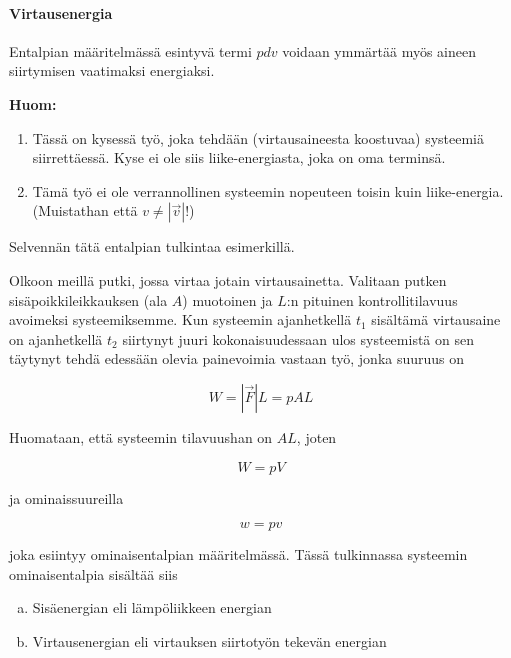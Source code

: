 \documentclass[12pt,a4paper,finnish]{book}
\begin{document}
\paragraph{Virtausenergia}

Entalpian määritelmässä esintyvä termi $pdv$ voidaan ymmärtää myös aineen siirtymisen vaatimaksi energiaksi. 

\textbf{Huom:}

\begin{enumerate}
 \item Tässä on kysessä työ, joka tehdään (virtausaineesta koostuvaa) systeemiä siirrettäessä. Kyse ei ole siis liike-energiasta, 
  joka on oma terminsä.
 \item Tämä työ ei ole verrannollinen systeemin nopeuteen toisin kuin liike-energia. (Muistathan että $v \neq \left|\vec{v}\right|$!)
\end{enumerate}

Selvennän tätä entalpian tulkintaa esimerkillä.

Olkoon meillä putki, jossa virtaa jotain virtausainetta. Valitaan putken sisäpoikkileikkauksen (ala $A$) muotoinen ja $L$:n 
pituinen kontrollitilavuus avoimeksi systeemiksemme. Kun systeemin ajanhetkellä $t_1$ sisältämä virtausaine on 
ajanhetkellä $t_2$ siirtynyt juuri kokonaisuudessaan ulos systeemistä on sen täytynyt tehdä edessään olevia 
painevoimia vastaan työ, jonka suuruus on

\begin{equation}
 W = |\vec{F}| L = pAL
\end{equation}

Huomataan, että systeemin tilavuushan on $AL$, joten

\begin{equation}
 W = pV
\end{equation}

ja ominaissuureilla 

\begin{equation}
 w = pv
\end{equation}

joka esiintyy ominaisentalpian määritelmässä. Tässä tulkinnassa systeemin ominaisentalpia sisältää siis

\begin{enumerate}[a)]
 \item Sisäenergian eli lämpöliikkeen energian
 \item Virtausenergian eli virtauksen siirtotyön tekevän energian
\end{enumerate}
\end{document}
